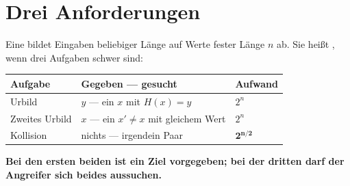 \section{Drei Anforderungen}

\begin{definition}
Eine  bildet Eingaben beliebiger Länge auf Werte fester Länge $n$ ab. Sie heißt , wenn drei Aufgaben schwer sind:

\begin{center}
{\small
\renewcommand{\arraystretch}{1.55}
\begin{tabular}{@{}P{2.8cm}P{3.2cm}P{2.2cm}@{}}
\toprule
\textbf{Aufgabe} & \textbf{Gegeben --- gesucht} & \textbf{Aufwand}\\
\midrule
Urbild & $y$ --- ein $x$ mit $H(x)=y$ & $2^{n}$\\
Zweites Urbild & $x$ --- ein $x'\ne x$ mit gleichem Wert & $2^{n}$\\
Kollision & nichts --- irgendein Paar & $\mathbf{2^{n/2}}$\\
\bottomrule
\end{tabular}}
\end{center}
\end{definition}

\begin{merksatz}
\begin{center}
\begin{minipage}{0.9\textwidth}
\textbf{Bei den ersten beiden ist ein Ziel vorgegeben; bei der dritten darf der Angreifer sich beides aussuchen.}
\end{minipage}
\end{center}

\begin{center}
\begin{minipage}{0.88\textwidth}
\end{minipage}
\end{center}
\end{merksatz}

